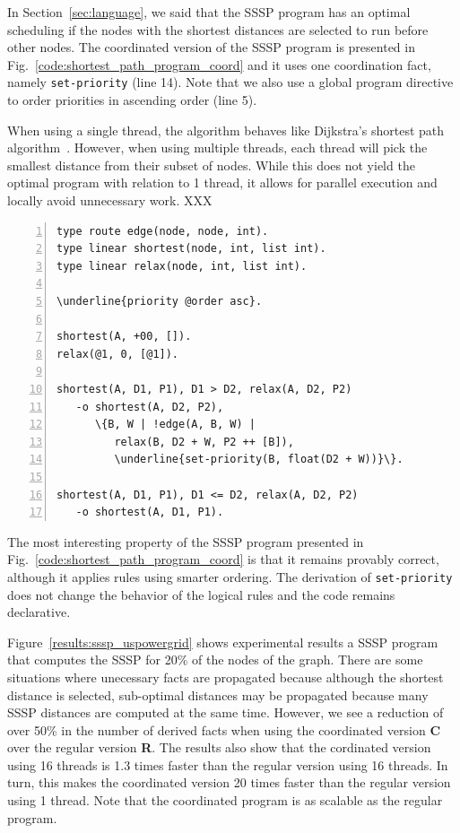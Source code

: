 In Section~\ref{sec:language}, we said that the SSSP program has an optimal
scheduling if the nodes with the shortest distances are selected to run before
other nodes.  The coordinated version of the SSSP
program is presented in Fig.~\ref{code:shortest_path_program_coord} and it
uses one coordination fact, namely \texttt{set-priority} (line 14). Note that we
also use a global program directive to order priorities in ascending order (line
5).

When using a single thread, the algorithm behaves like
Dijkstra's shortest path algorithm~\cite{Dijkstra}. However, when using multiple
threads, each thread will pick the smallest distance from their subset of nodes.
While this does not yield the optimal program with relation to 1 thread, it
allows for parallel execution and locally avoid unnecessary work. XXX

\begin{topfig}
\scriptsize\begin{Verbatim}[numbers=left,commandchars=\\\{\}]
type route edge(node, node, int).
type linear shortest(node, int, list int).
type linear relax(node, int, list int).

\underline{priority @order asc}.

shortest(A, +00, []).
relax(@1, 0, [@1]).

shortest(A, D1, P1), D1 > D2, relax(A, D2, P2)
   -o shortest(A, D2, P2),
      \{B, W | !edge(A, B, W) |
         relax(B, D2 + W, P2 ++ [B]),
         \underline{set-priority(B, float(D2 + W))}\}.

shortest(A, D1, P1), D1 <= D2, relax(A, D2, P2)
   -o shortest(A, D1, P1).
\end{Verbatim}
\end{topfig}
\normalsize

The most interesting property of the SSSP program presented in
Fig.~\ref{code:shortest_path_program_coord} is that it remains provably correct,
although it applies rules using smarter ordering. The derivation of
\texttt{set-priority} does not change the behavior of the logical rules and the
code remains declarative.

Figure~\ref{results:sssp_uspowergrid} shows experimental results a
SSSP program that computes the SSSP for 20\% of the nodes of the graph.
There are some situations where unecessary facts are propagated
because although the shortest distance is selected, sub-optimal distances may be
propagated because many SSSP distances are computed at the same time.
However, we see a reduction of over 50\% in the number of
derived facts when using the coordinated version \textbf{C} over the regular
version \textbf{R}. The results also show that the cordinated
version using 16 threads is 1.3 times faster than the regular version using 16
threads. In turn, this makes the coordinated version 20 times faster
than the regular version using 1 thread. Note that the coordinated program is as
scalable as the regular program.

